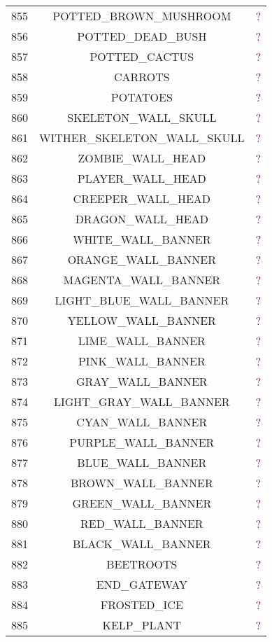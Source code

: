 \documentclass[11pt]{article}
\newcommand\myworries[1]{\textcolor{purple}{#1}}
\begin{document}
\begin{longtable}{ |c|c|c| }
	855 & POTTED\_BROWN\_MUSHROOM & \myworries{?} \\
	856 & POTTED\_DEAD\_BUSH & \myworries{?} \\
	857 & POTTED\_CACTUS & \myworries{?} \\
	858 & CARROTS & \myworries{?} \\
	859 & POTATOES & \myworries{?} \\
	860 & SKELETON\_WALL\_SKULL & \myworries{?} \\
	861 & WITHER\_SKELETON\_WALL\_SKULL & \myworries{?} \\
	862 & ZOMBIE\_WALL\_HEAD & \myworries{?} \\
	863 & PLAYER\_WALL\_HEAD & \myworries{?} \\
	864 & CREEPER\_WALL\_HEAD & \myworries{?} \\
	865 & DRAGON\_WALL\_HEAD & \myworries{?} \\
	866 & WHITE\_WALL\_BANNER & \myworries{?} \\
	867 & ORANGE\_WALL\_BANNER & \myworries{?} \\
	868 & MAGENTA\_WALL\_BANNER & \myworries{?} \\
	869 & LIGHT\_BLUE\_WALL\_BANNER & \myworries{?} \\
	870 & YELLOW\_WALL\_BANNER & \myworries{?} \\
	871 & LIME\_WALL\_BANNER & \myworries{?} \\
	872 & PINK\_WALL\_BANNER & \myworries{?} \\
	873 & GRAY\_WALL\_BANNER & \myworries{?} \\
	874 & LIGHT\_GRAY\_WALL\_BANNER & \myworries{?} \\
	875 & CYAN\_WALL\_BANNER & \myworries{?} \\
	876 & PURPLE\_WALL\_BANNER & \myworries{?} \\
	877 & BLUE\_WALL\_BANNER & \myworries{?} \\
	878 & BROWN\_WALL\_BANNER & \myworries{?} \\
	879 & GREEN\_WALL\_BANNER & \myworries{?} \\
	880 & RED\_WALL\_BANNER & \myworries{?} \\
	881 & BLACK\_WALL\_BANNER & \myworries{?} \\
	882 & BEETROOTS & \myworries{?} \\
	883 & END\_GATEWAY & \myworries{?} \\
	884 & FROSTED\_ICE & \myworries{?} \\
	885 & KELP\_PLANT & \myworries{?} \\

\end{longtable}
\end{document}
